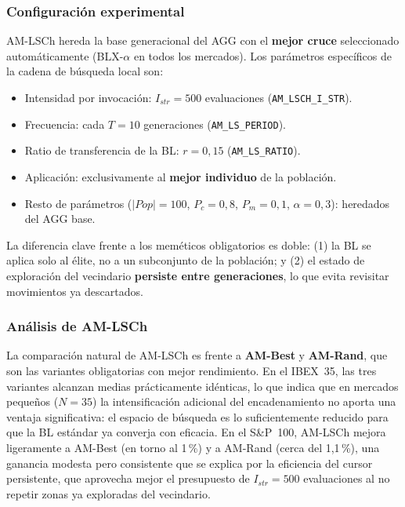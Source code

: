 \subsubsection{Configuración experimental}

AM-LSCh hereda la base generacional del AGG con el \textbf{mejor cruce} seleccionado automáticamente (BLX-$\alpha$ en todos los mercados). Los parámetros específicos de la cadena de búsqueda local son:

\begin{itemize}[noitemsep]
    \item Intensidad por invocación: $I_{str} = 500$ evaluaciones (\texttt{AM\_LSCH\_I\_STR}).
    \item Frecuencia: cada $T = 10$ generaciones (\texttt{AM\_LS\_PERIOD}).
    \item Ratio de transferencia de la BL: $r = 0{,}15$ (\texttt{AM\_LS\_RATIO}).
    \item Aplicación: exclusivamente al \textbf{mejor individuo} de la población.
    \item Resto de parámetros ($|Pop|=100$, $P_c=0{,}8$, $P_m=0{,}1$, $\alpha=0{,}3$): heredados del AGG base.
\end{itemize}

La diferencia clave frente a los meméticos obligatorios es doble: (1) la BL se aplica solo al élite, no a un subconjunto de la población; y (2) el estado de exploración del vecindario \textbf{persiste entre generaciones}, lo que evita revisitar movimientos ya descartados.

\subsubsection{Análisis de AM-LSCh}

La comparación natural de AM-LSCh es frente a \textbf{AM-Best} y \textbf{AM-Rand}, que son las variantes obligatorias con mejor rendimiento. En el IBEX~35, las tres variantes alcanzan medias prácticamente idénticas, lo que indica que en mercados pequeños ($N=35$) la intensificación adicional del encadenamiento no aporta una ventaja significativa: el espacio de búsqueda es lo suficientemente reducido para que la BL estándar ya converja con eficacia. En el S\&P~100, AM-LSCh mejora ligeramente a AM-Best (en torno al 1\,\%) y a AM-Rand (cerca del 1{,}1\,\%), una ganancia modesta pero consistente que se explica por la eficiencia del cursor persistente, que aprovecha mejor el presupuesto de $I_{str}=500$ evaluaciones al no repetir zonas ya exploradas del vecindario.

